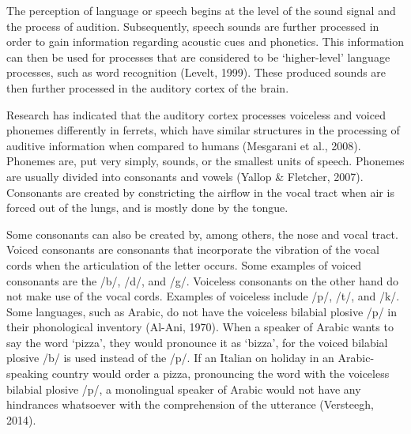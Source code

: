The perception of language or speech begins at the level of the sound signal and the process of audition. Subsequently, speech sounds are further processed in order to gain information regarding acoustic cues and phonetics. This information can then be used for processes that are considered to be ‘higher-level’ language processes, such as word recognition (Levelt, 1999). These produced sounds are then further processed in the auditory cortex of the brain. 

Research has indicated that the auditory cortex processes voiceless and voiced phonemes differently in ferrets, which have similar structures in the processing of auditive information when compared to humans (Mesgarani et al., 2008). Phonemes are, put very simply, sounds, or the smallest units of speech. Phonemes are usually divided into consonants and vowels (Yallop \& Fletcher, 2007). Consonants are created by constricting the airflow in the vocal tract when air is forced out of the lungs, and is mostly done by the tongue. 

Some consonants can also be created by, among others, the nose and vocal tract. Voiced consonants are consonants that incorporate the vibration of the vocal cords when the articulation of the letter occurs. Some examples of voiced consonants are the /b/, /d/, and /g/. Voiceless consonants on the other hand do not make use of the vocal cords. Examples of voiceless include /p/, /t/, and /k/. Some languages, such as Arabic, do not have the voiceless bilabial plosive /p/ in their phonological inventory (Al-Ani, 1970). When a speaker of Arabic wants to say the word ‘pizza’, they would pronounce it as ‘bizza’, for the voiced bilabial plosive /b/ is used instead of the /p/. If an Italian on holiday in an Arabic-speaking country would order a pizza, pronouncing the word with the voiceless bilabial plosive /p/, a monolingual speaker of Arabic would not have any hindrances whatsoever with the comprehension of the utterance (Versteegh, 2014). 


